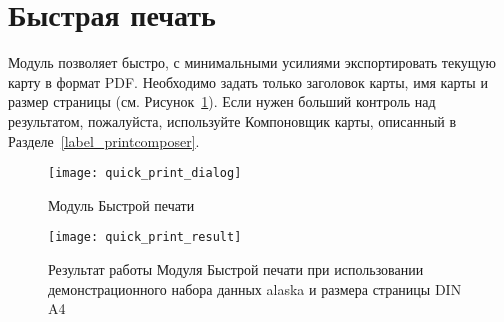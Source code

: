 
\section{Быстрая печать}\label{quickprint}


Модуль  позволяет быстро, с
минимальными усилиями экспортировать текущую карту в формат PDF. Необходимо
задать только заголовок карты, имя карты и размер страницы
(см. Рисунок~\ref{fig:quickprint}). Если нужен больший контроль над
результатом, пожалуйста, используйте Компоновщик карты, описанный в
Разделе~\ref{label_printcomposer}.

\begin{figure}[ht]
   \centering
   \texttt{[image: quick\_print\_dialog]}
   \caption{Модуль Быстрой печати \wincaption}\label{fig:quickprint}
\end{figure}

\begin{figure}[ht]
   \centering
   \texttt{[image: quick\_print\_result]}
   \caption{Результат работы Модуля Быстрой печати при использовании демонстрационного
   набора данных alaska и размера страницы DIN A4 \wincaption}\label{fig:quickprint_result}
\end{figure}

\FloatBarrier
